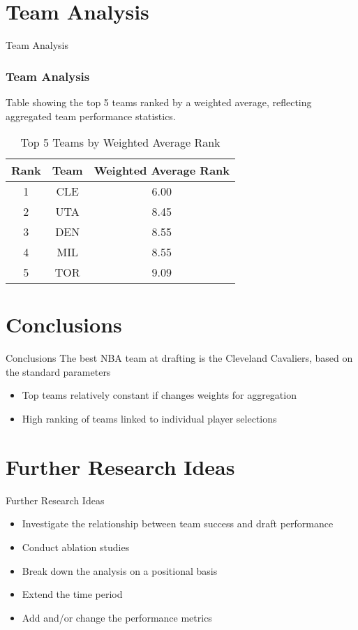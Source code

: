 \documentclass{beamer}
\begin{document}
\section{Team Analysis}
\begin{frame}{Team Analysis}
    \frametitle{Team Analysis}
    
    Table showing the top 5 teams ranked by a weighted average, reflecting aggregated team performance statistics.
    
    \begin{table}
        \centering
        \caption{Top 5 Teams by Weighted Average Rank}
        \vspace{5mm} %
        \label{table:2}
        \begin{tabular}{|c|c|c|}
        \hline
        \rowcolor{gray!50} Rank & Team & Weighted Average Rank \\ %
        \hline
        1 & CLE & 6.00 \\
        \hline
        2 & UTA & 8.45 \\
        \hline
        3 & DEN & 8.55 \\
        \hline
        4 & MIL & 8.55 \\
        \hline
        5 & TOR & 9.09 \\
        \hline
        \end{tabular}
    \end{table}
    
    \end{frame}






\section{Conclusions}
\begin{frame}{Conclusions}
  The best NBA team at drafting is the Cleveland Cavaliers, based on the standard parameters
  \begin{itemize}
    \item Top teams relatively constant if changes weights for aggregation
    \item High ranking of teams linked to individual player selections
  \end{itemize}
\end{frame}

\section{Further Research Ideas}
\begin{frame}{Further Research Ideas}
  \begin{itemize}
    \item Investigate the relationship between team success and draft performance
    \item Conduct ablation studies
    \item Break down the analysis on a positional basis
    \item Extend the time period
    \item Add and/or change the performance metrics
  \end{itemize}
\end{frame}
\end{document}
